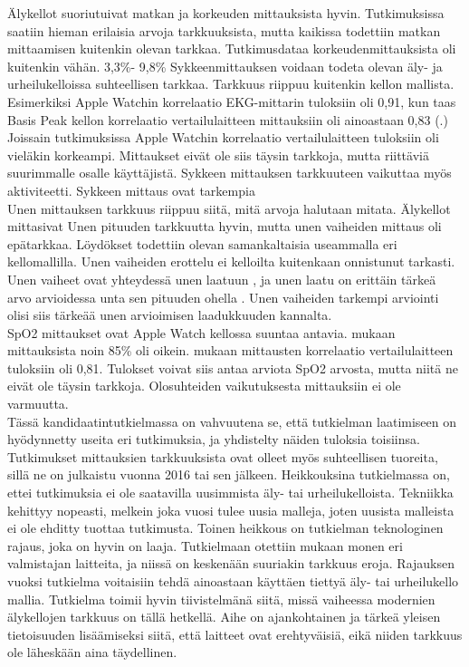 \documentclass[utf8,bachelor,finnish]{bachelor}
\begin{document}
Älykellot suoriutuivat matkan ja korkeuden mittauksista hyvin. Tutkimuksissa saatiin hieman erilaisia arvoja tarkkuuksista, mutta kaikissa
 todettiin matkan mittaamisen kuitenkin olevan tarkkaa. Tutkimusdataa korkeudenmittauksista oli kuitenkin vähän. 3,3\%- 9,8\%
  Sykkeenmittauksen voidaan todeta olevan äly- ja urheilukelloissa suhteellisen tarkkaa. Tarkkuus riippuu kuitenkin kellon mallista.
   Esimerkiksi Apple Watchin korrelaatio EKG-mittarin tuloksiin oli 0,91, kun taas Basis Peak kellon korrelaatio vertailulaitteen mittauksiin
    oli ainoastaan 0,83 (\cite{wang_accuracy_2017}.) Joissain tutkimuksissa Apple Watchin korrelaatio vertailulaitteen tuloksiin oli vieläkin korkeampi.
     Mittaukset eivät ole siis täysin tarkkoja, mutta riittäviä suurimmalle osalle käyttäjistä. Sykkeen mittauksen tarkkuuteen vaikuttaa myös
      aktiviteetti. Sykkeen mittaus ovat tarkempia \\

Unen mittauksen tarkkuus riippuu siitä, mitä arvoja halutaan mitata. Älykellot mittasivat Unen pituuden tarkkuutta hyvin, mutta unen vaiheiden mittaus oli epätarkkaa.
 Löydökset todettiin olevan samankaltaisia useammalla eri kellomallilla. 
 Unen vaiheiden erottelu ei kelloilta kuitenkaan onnistunut tarkasti. Unen vaiheet ovat yhteydessä unen laatuun \parencite{krystal_measuring_2008},
  ja unen laatu on erittäin tärkeä arvo arvioidessa unta sen pituuden ohella \parencite{kohyama_which_2021}. Unen vaiheiden
   tarkempi arviointi olisi siis tärkeää unen arvioimisen laadukkuuden kannalta.\\
  
SpO2 mittaukset ovat Apple Watch kellossa suuntaa antavia.
 \textcite{patz_accuracy_2023} mukaan mittauksista noin 85\% oli oikein. \textcite{pipek_comparison_2021} mukaan mittausten korrelaatio vertailulaitteen tuloksiin oli 0,81.
   Tulokset voivat siis antaa arviota SpO2 arvosta, mutta niitä ne eivät ole täysin tarkkoja. Olosuhteiden vaikutuksesta mittauksiin ei ole varmuutta.\\

Tässä kandidaatintutkielmassa on vahvuutena se, että tutkielman laatimiseen on hyödynnetty useita eri tutkimuksia, ja yhdistelty näiden tuloksia toisiinsa.
 Tutkimukset mittauksien tarkkuuksista ovat olleet myös suhteellisen tuoreita, sillä ne on julkaistu vuonna 2016 tai sen jälkeen.
  Heikkouksina tutkielmassa on, ettei tutkimuksia ei ole saatavilla uusimmista äly- tai urheilukelloista. Tekniikka kehittyy nopeasti,
  melkein joka vuosi tulee uusia malleja, joten uusista malleista ei ole ehditty tuottaa tutkimusta.
     Toinen heikkous on tutkielman teknologinen rajaus, joka on hyvin on laaja. Tutkielmaan otettiin mukaan monen eri valmistajan laitteita, ja niissä
      on keskenään suuriakin tarkkuus eroja. Rajauksen vuoksi tutkielma voitaisiin tehdä ainoastaan käyttäen tiettyä äly- tai urheilukello mallia.
       Tutkielma toimii hyvin tiivistelmänä siitä, missä vaiheessa modernien älykellojen tarkkuus on tällä hetkellä. Aihe on ajankohtainen
        ja tärkeä yleisen tietoisuuden lisäämiseksi siitä, että laitteet ovat erehtyväisiä, eikä niiden tarkkuus ole läheskään aina täydellinen.
\end{document}
